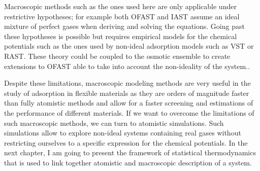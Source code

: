 \documentclass[thesis]{subfiles}
\begin{document}
Macroscopic methods such as the ones used here are only applicable under
restrictive hypotheses; for example both OFAST and IAST assume an ideal mixture
of perfect gases when deriving and solving the equations. Going past these
hypotheses is possible but requires empirical models for the chemical potentials
such as the ones used by non-ideal adsorption models such as VST or RAST. These
theory could be coupled to the osmotic ensemble to create extensions to OFAST
able to take into account the non-ideality of the system..

Despite these limitations, macroscopic modeling methods are very useful in the
study of adsorption in flexible materials as they are orders of magnitude faster
than fully atomistic methods and allow for a faster screening and estimations of
the performance of different materials. If we want to overcome the limitations
of such macroscopic methods, we can turn to atomistic simulations. Such
simulations allow to explore non-ideal systems containing real gases without
restricting ourselves to a specific expression for the chemical potentials. In
the next chapter, I am going to present the framework of statistical
thermodynamics that is used to link together atomistic and macroscopic
description of a system.

\OnlyInSubfile{\printglobalbibliography}
\end{document}
